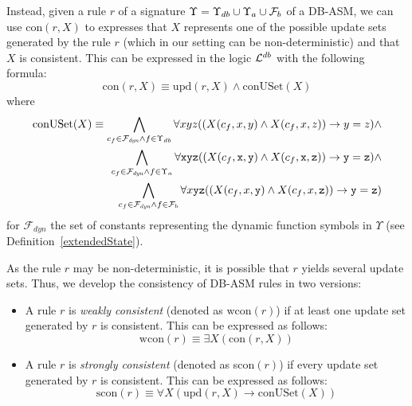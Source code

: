 \documentclass[preprint,11pt]{elsarticle}
\theoremstyle{definition}
\theoremstyle{remark}
\begin{document}
Instead, given a rule $r$ of a signature $\Upsilon = \Upsilon_{db} \cup \Upsilon_a \cup {\cal F}_b$ of a DB-ASM, we can use $\mathrm{con}(r,X)$ to expresses that $X$ represents one of the possible update sets generated by the rule $r$ (which in our setting can be non-deterministic) and that $X$ is consistent. This can be expressed in the logic ${\cal L}^{db}$ with the following formula:
\begin{equation}\label{conr}
\text{con}(r,X)\equiv\mathrm{upd}(r,X)\wedge\mathrm{conUSet}(X)
\end{equation}
where 
\begin{eqnarray}\label{con}
\mathrm{conUSet}(X)\equiv\bigwedge\limits_{c_f\in \mathcal{F}_{\mathit{dyn}} \wedge f \in \Upsilon_{db}} \forall x y z ((X(c_f,x,y) \wedge X(c_f, x, z)) \rightarrow y=z) \wedge \\
\bigwedge\limits_{c_f\in \mathcal{F}_{\mathit{dyn}} \wedge f \in \Upsilon_{a}} \forall \mathtt{x} \mathtt{y} \mathtt{z} ((X(c_f,\mathtt{x},\mathtt{y}) \wedge X(c_f, \mathtt{x}, \mathtt{z})) \rightarrow \mathtt{y}=\mathtt{z}) \wedge \nonumber\\
\bigwedge\limits_{c_f\in \mathcal{F}_{\mathit{dyn}} \wedge f \in {\cal F}_b} \forall x \mathtt{y} \mathtt{z} ((X(c_f,x,\mathtt{y}) \wedge X(c_f, x, \mathtt{z})) \rightarrow \mathtt{y}=\mathtt{z}) \nonumber
\end{eqnarray}
for $\mathcal{F}_{\mathit{dyn}}$ the set of constants representing the dynamic function symbols in $\Upsilon$ (see Definition~\ref{extendedState}).   

As the rule $r$ may be non-deterministic, it is possible that $r$
yields several update sets. Thus, we develop the consistency of DB-ASM rules in
two versions:

\begin{itemize}

\item A rule $r$ is \emph{weakly consistent} (denoted as
$\mathrm{wcon}(r)$) if at least one update set generated
by $r$ is consistent. This can be expressed as follows:
\begin{equation}\label{wcon}
  \text{wcon}(r)\equiv \exists X (\mathrm{con}(r,X))
\end{equation}

\item A rule $r$ is \emph{strongly consistent} (denoted as
scon$(r)$) if every update set generated by $r$
is consistent. This can be expressed as follows:
\begin{equation}\label{scon}
  \text{scon}(r)\equiv \forall X (\text{upd}(r,X)\rightarrow\mathrm{conUSet}(X))
\end{equation}

\end{itemize}
\end{document}
